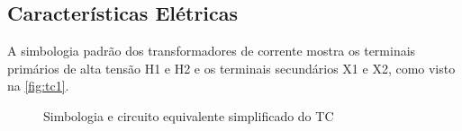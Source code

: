 \documentclass[a5paper,english,spanish,brazil]{ufsc-thesis}
\begin{document}
		\subsection{Características Elétricas}
			A simbologia padrão dos transformadores de corrente mostra os terminais primários de alta tensão H1 e H2 e os terminais secundários X1 e X2, como visto na \autoref{fig:tc1}.

			\begin{figure}[htb]
				\caption{Simbologia e circuito equivalente simplificado do TC}
				\centering
			\end{figure}
			
\end{document}
